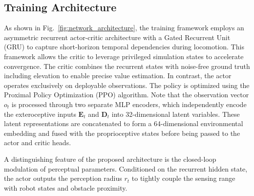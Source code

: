 \subsection{Training Architecture}
\label{sec:training_architecture}

As shown in Fig.~\ref{fig:network_architecture}, the training framework employs an asymmetric recurrent actor-critic architecture with a Gated Recurrent Unit (GRU) to capture short-horizon temporal dependencies during locomotion. This framework allows the critic to leverage privileged simulation states to accelerate convergence. 
The critic combines the recurrent states with noise-free ground truth including elevation to enable precise value estimation. 
In contrast, the actor operates exclusively on deployable observations.
The policy is optimized using the Proximal Policy Optimization (PPO) algorithm. Note that the observation vector $o_t$ is processed through two separate MLP encoders, which independently encode the exteroceptive inputs $\mathbf{E}_t$ and $\mathbf{D}_t$ into 32-dimensional latent variables. These latent representations are concatenated to form a 64-dimensional environmental embedding and fused with the proprioceptive states before being passed to the actor and critic heads.

A distinguishing feature of the proposed architecture is the closed-loop modulation of perceptual parameters. Conditioned on the recurrent hidden state, the actor outputs the perception radius $r_t$ to tightly couple the sensing range with robot states and obstacle proximity.
